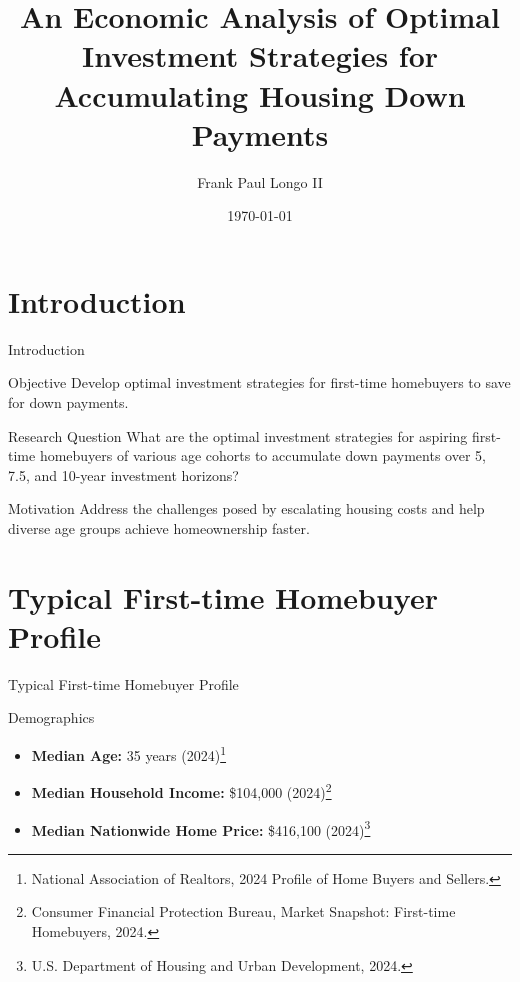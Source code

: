 \documentclass{beamer}
\title{An Economic Analysis of Optimal Investment Strategies for Accumulating Housing Down Payments}
\author{Frank Paul Longo II}
\date{\today}
\begin{document}
\begin{frame}
    \titlepage
\end{frame}





\section{Introduction}
\begin{frame}{Introduction}
    \begin{block}{Objective}
        Develop optimal investment strategies for first-time homebuyers to save for down payments.
    \end{block}
    \begin{block}{Research Question}
        What are the optimal investment strategies for aspiring first-time homebuyers of various age cohorts to accumulate down payments over 5, 7.5, and 10-year investment horizons?
    \end{block}
    \begin{block}{Motivation}
        Address the challenges posed by escalating housing costs and help diverse age groups achieve homeownership faster.
    \end{block}
\end{frame}








\section{Typical First-time Homebuyer Profile}
\begin{frame}{Typical First-time Homebuyer Profile}
    \begin{block}{Demographics}
        \begin{itemize}
            \item \textbf{Median Age:} 35 years (2024)\footnote{National Association of Realtors, 2024 Profile of Home Buyers and Sellers.}
            \item \textbf{Median Household Income:} \$104,000 (2024)\footnote{Consumer Financial Protection Bureau, Market Snapshot: First-time Homebuyers, 2024.}
            \item \textbf{Median Nationwide Home Price:} \$416,100 (2024)\footnote{U.S. Department of Housing and Urban Development, 2024.}
        \end{itemize}
    \end{block}
\end{frame}
\end{document}
